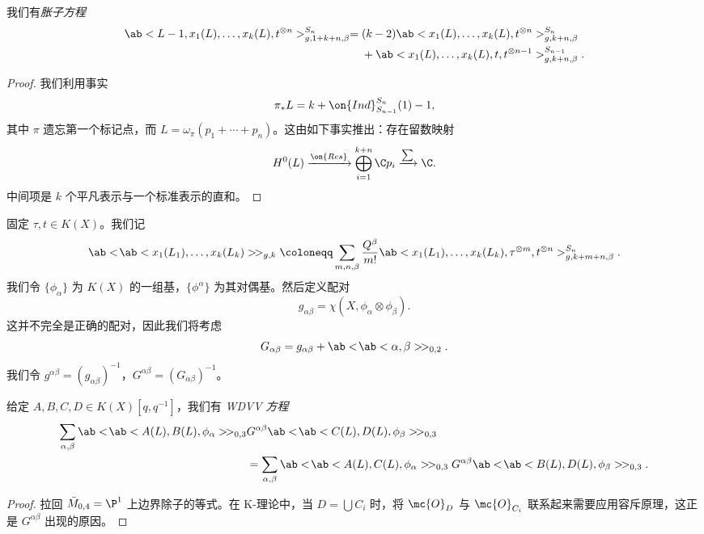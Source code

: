 \begin{lem}
    我们有\textit{胀子方程}
    \begin{align*}
        \ab<L-1, x_1(L), \ldots, x_k(L), t^{\otimes n}>_{g,1+k+n,\beta}^{S_n} ={}& (k-2)\ab<x_1(L), \ldots, x_k(L), t^{\otimes n}>_{g,k+n,\beta}^{S_n} \\
        &+ \ab<x_1(L), \ldots, x_k(L), t, t^{\otimes n-1}>_{g,k+n,\beta}^{S_{n-1}}.
    \end{align*}
\end{lem}

\begin{proof}
    我们利用事实
    \[ \pi_* L = k + \on{Ind}_{S_{n-1}}^{S_n}(1) - 1, \]
    其中 \(\pi\) 遗忘第一个标记点，而 \(L = \omega_{\pi} (p_1 + \cdots + p_n)\)。这由如下事实推出：存在留数映射
    \[ H^0(L) \xrightarrow{\on{Res}} \bigoplus_{i=1}^{k+n} \C p_i \xrightarrow{\sum} \C. \]
    中间项是 \(k\) 个平凡表示与一个标准表示的直和。
\end{proof}

\begin{notn}
    固定 \(\tau, t \in K(X)\)。我们记
    \[ \ab<\!\ab<x_1(L_1), \ldots, x_k(L_k)>\!>_{g,k} \coloneqq \sum_{m,n,\beta} \frac{Q^{\beta}}{m!} \ab<x_1(L_1), \ldots, x_k(L_k), \tau^{\otimes m}, t^{\otimes n}>_{g,k+m+n,\beta}^{S_n}. \]
    我们令 \(\{\phi_{\alpha}\}\) 为 \(K(X)\) 的一组基，\(\{\phi^{\alpha}\}\) 为其对偶基。然后定义配对
    \[ g_{\alpha\beta} = \chi(X, \phi_{\alpha} \otimes \phi_{\beta}). \]
    这并不完全是正确的配对，因此我们将考虑
    \[ G_{\alpha\beta} = g_{\alpha\beta} + \ab<\!\ab<\alpha,\beta>\!>_{0,2}. \]
    我们令 \(g^{\alpha\beta} = (g_{\alpha\beta})^{-1}\)，\(G^{\alpha\beta} = (G_{\alpha\beta})^{-1}\)。
\end{notn}

\begin{lem}
    给定 \(A,B,C,D \in K(X)[q,q^{-1}]\)，我们有 \textit{WDVV 方程}
    \begin{align*}
        \sum_{\alpha,\beta} \ab<\!\ab< A(L), B(L), \phi_{\alpha}>\! >_{0,3}& G^{\alpha\beta}\ab<\!\ab< C(L), D(L), \phi_{\beta}>\! >_{0,3} \\
        &= \sum_{\alpha,\beta} \ab<\!\ab< A(L), C(L), \phi_{\alpha}>\! >_{0,3} G^{\alpha\beta}\ab<\!\ab< B(L), D(L), \phi_{\beta}>\! >_{0,3}. 
    \end{align*}
\end{lem}

\begin{proof}
    拉回 \(\bar{M}_{0,4} = \P^1\) 上边界除子的等式。在 K-理论中，当 \(D = \bigcup C_i\) 时，将 \(\mc{O}_D\) 与 \(\mc{O}_{C_i}\) 联系起来需要应用容斥原理，这正是 \(G^{\alpha\beta}\) 出现的原因。
\end{proof}

